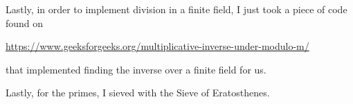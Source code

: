 \documentclass[12pt]{article}
\begin{document}
Lastly, in order to implement division in a finite field, I just took a piece of code found on
\begin{center}
    \url{https://www.geeksforgeeks.org/multiplicative-inverse-under-modulo-m/}
\end{center}
that implemented finding the inverse over a finite field for us. 

Lastly, for the primes, I sieved with the Sieve of Eratosthenes. 
\end{document}
